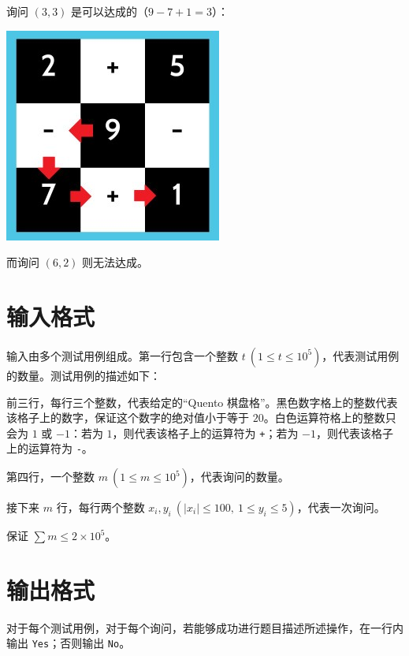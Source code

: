 \documentclass{../cpct/ctpro}
\begin{document}
询问 $(3, 3)$ 是可以达成的（$9-7+1=3$）：

\begin{center}
    \includegraphics{images/quento2.jpg}
\end{center}

而询问 $(6, 2)$ 则无法达成。

\section*{输入格式}

输入由多个测试用例组成。第一行包含一个整数 $t~(1 \leq t \leq {10}^5)$，代表测试用例的数量。测试用例的描述如下：

前三行，每行三个整数，代表给定的“Quento 棋盘格”。黑色数字格上的整数代表该格子上的数字，保证这个数字的绝对值小于等于 $20$。白色运算符格上的整数只会为 $1$ 或 $-1$：若为 $1$，则代表该格子上的运算符为 \texttt{+}；若为 $-1$，则代表该格子上的运算符为 \texttt{-}。

第四行，一个整数 $m~(1 \leq m \leq {10}^5)$，代表询问的数量。

接下来 $m$ 行，每行两个整数 $x_i, y_i~(|x_i| \leq 100,~1 \leq y_i \leq 5)$，代表一次询问。

保证 $\sum m \leq 2 \times {10}^5$。

\section*{输出格式}

对于每个测试用例，对于每个询问，若能够成功进行题目描述所述操作，在一行内输出 \texttt{Yes}；否则输出 \texttt{No}。
\end{document}
